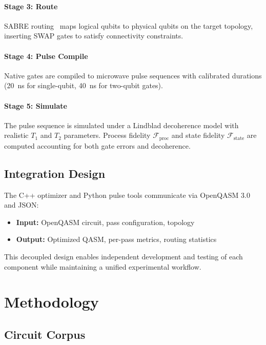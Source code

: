 \documentclass[twocolumn,showpacs,preprintnumbers,amsmath,amssymb,prb]{revtex4-2}
\newcommand{\fid}{\mathcal{F}}
\begin{document}
\paragraph{Stage 3: Route} SABRE routing~\cite{li2019tackling} maps logical qubits to physical qubits on the target topology, inserting SWAP gates to satisfy connectivity constraints.

\paragraph{Stage 4: Pulse Compile} Native gates are compiled to microwave pulse sequences with calibrated durations (\SI{20}{\nano\second} for single-qubit, \SI{40}{\nano\second} for two-qubit gates).

\paragraph{Stage 5: Simulate} The pulse sequence is simulated under a Lindblad decoherence model with realistic $T_1$ and $T_2$ parameters. Process fidelity $\fid_{\text{proc}}$ and state fidelity $\fid_{\text{state}}$ are computed accounting for both gate errors and decoherence.

\subsection{Integration Design}

The C++ optimizer and Python pulse tools communicate via OpenQASM 3.0 and JSON:
\begin{itemize}
    \item \textbf{Input:} OpenQASM circuit, pass configuration, topology
    \item \textbf{Output:} Optimized QASM, per-pass metrics, routing statistics
\end{itemize}

This decoupled design enables independent development and testing of each component while maintaining a unified experimental workflow.

\section{Methodology}
\label{sec:methodology}

\subsection{Circuit Corpus}
\end{document}
